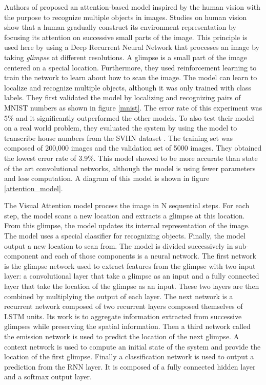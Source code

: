\documentclass[11pt]{sdm}
\begin{document}
Authors of \cite{ba_multiple_2014} proposed an attention-based model inspired by the human vision with the purpose to recognize multiple objects in images.
Studies on human vision show that a human gradually construct its environment representation by focusing its attention on successive small parts of the image.
This principle is used here by using a Deep Recurrent Neural Network that processes an image by taking \textit{glimpse} at different resolutions.
A glimpse is a small part of the image centered on a special location.
Furthermore, they used reinforcement learning to train the network to learn about how to scan the image.
The model can learn to localize and recognize multiple objects, although it was only trained with class labels.
They first validated the model by localizing and recognizing pairs of MNIST numbers as shown in figure \ref{mnist}.
The error rate of this experiment was 5\% and it significantly outperformed the other models.
To also test their model on a real world problem, they evaluated the system by using the model to transcribe house numbers from the SVHN dataset \cite{netzer_reading_2011}.
The training set was composed of 200,000 images and the validation set of 5000 images.
They obtained the lowest error rate of 3.9\%.
This model showed to be more accurate than state of the art convolutional networks, although the model is using fewer parameters and less computation.
A diagram of this model is shown in figure \ref{attention_model}.

The Visual Attention model process the image in N sequential steps.
For each step, the model scans a new location and extracts a glimpse at this location.
From this glimpse, the model updates its internal representation of the image.
The model uses a special classifier for recognizing objects.
Finally, the model output a new location to scan from.
The model is divided successively in sub-component and each of those components is a neural network.
The first network is the glimpse network used to extract features from the glimpse with two input layer: a convolutional layer that take a glimpse as an input and a fully connected layer that take the location of the glimpse as an input.
These two layers are then combined by multiplying the output of each layer.
The next network is a recurrent network composed of two recurrent layers composed themselves of LSTM units.
Its work is to aggregate information extracted from successive glimpses while preserving the spatial information.
Then a third network called the emission network is used to predict the location of the next glimpse.
A context network is used to compute an initial state of the system and provide the location of the first glimpse.
Finally a classification network is used to output a prediction from the RNN layer.
It is composed of a fully connected hidden layer and a softmax output layer.
\end{document}
